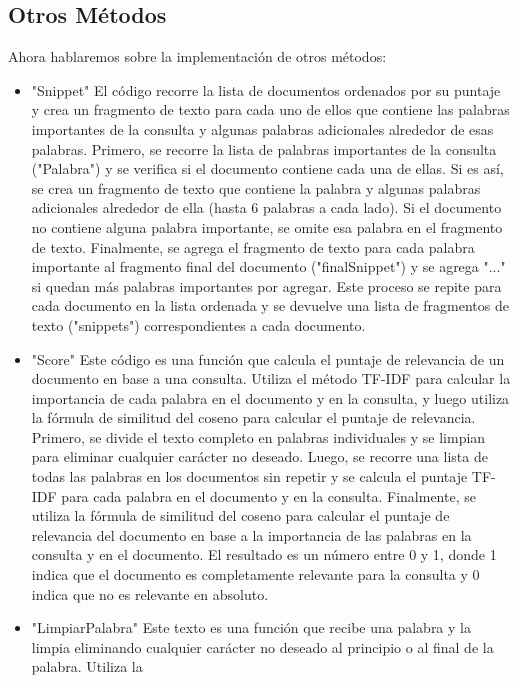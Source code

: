 \documentclass{article}
\begin{document}
\subsection{Otros Métodos }
Ahora hablaremos sobre la implementación de otros métodos: 
\begin{itemize}
    \item "Snippet" 
    El código recorre la lista de documentos ordenados por su puntaje y crea un 
    fragmento de texto para cada uno de ellos que contiene las palabras 
    importantes de la consulta y algunas palabras adicionales alrededor de esas 
    palabras. 
    Primero, se recorre la lista de palabras importantes de la consulta ("Palabra") y 
    se verifica si el documento contiene cada una de ellas. Si es así, se crea un 
    fragmento de texto que contiene la palabra y algunas palabras adicionales 
    alrededor de ella (hasta 6 palabras a cada lado). Si el documento no contiene 
    alguna palabra importante, se omite esa palabra en el fragmento de texto. 
    Finalmente, se agrega el fragmento de texto para cada palabra importante al 
    fragmento final del documento ("finalSnippet") y se agrega "..." si quedan más 
    palabras importantes por agregar. 
    Este proceso se repite para cada documento en la lista ordenada y se devuelve 
    una lista de fragmentos de texto ("snippets") correspondientes a cada 
    documento.
    \item "Score" 
    Este código es una función que calcula el puntaje de relevancia de un 
    documento en base a una consulta. Utiliza el método TF-IDF para calcular la 
    importancia de cada palabra en el documento y en la consulta, y luego utiliza la 
    fórmula de similitud del coseno para calcular el puntaje de relevancia. 
    Primero, se divide el texto completo en palabras individuales y se limpian para 
    eliminar cualquier carácter no deseado. Luego, se recorre una lista de todas las 
    palabras en los documentos sin repetir y se calcula el puntaje TF-IDF para 
    cada palabra en el documento y en la consulta. 
    Finalmente, se utiliza la fórmula de similitud del coseno para calcular el puntaje 
    de relevancia del documento en base a la importancia de las palabras en la 
    consulta y en el documento. El resultado es un número entre 0 y 1, donde 1 
    indica que el documento es completamente relevante para la consulta y 0 
    indica que no es relevante en absoluto.
    \item "LimpiarPalabra" 
    Este texto es una función que recibe una palabra y la limpia eliminando 
    cualquier carácter no deseado al principio o al final de la palabra. Utiliza la 

\end{itemize}
\end{document}
